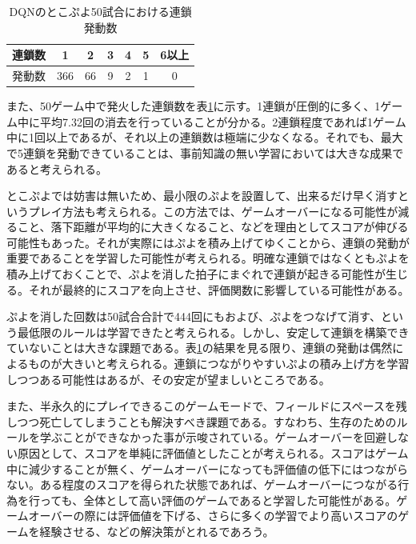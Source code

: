\documentclass[12pt]{jarticle}
\begin{document}
\begin{table}[htb]
\begin{center}
\caption{DQNのとこぷよ50試合における連鎖発動数} \label{tab:dqn_chain_tokopuyo}
\begin{tabular}{|l|c|c|c|c|c|c|} \hline
連鎖数 & 1 & 2 & 3 & 4 & 5 & 6以上\\ \hline
発動数 & 366 & 66 & 9 & 2 & 1 & 0\\ \hline
\end{tabular}
\end{center}
\end{table}

また、50ゲーム中で発火した連鎖数を表\ref{tab:dqn_chain_tokopuyo}に示す。1連鎖が圧倒的に多く、1ゲーム中に平均7.32回の消去を行っていることが分かる。2連鎖程度であれば1ゲーム中に1回以上であるが、それ以上の連鎖数は極端に少なくなる。それでも、最大で5連鎖を発動できていることは、事前知識の無い学習においては大きな成果であると考えられる。

とこぷよでは妨害は無いため、最小限のぷよを設置して、出来るだけ早く消すというプレイ方法も考えられる。この方法では、ゲームオーバーになる可能性が減ること、落下距離が平均的に大きくなること、などを理由としてスコアが伸びる可能性もあった。それが実際にはぷよを積み上げてゆくことから、連鎖の発動が重要であることを学習した可能性が考えられる。明確な連鎖ではなくともぷよを積み上げておくことで、ぷよを消した拍子にまぐれで連鎖が起きる可能性が生じる。それが最終的にスコアを向上させ、評価関数に影響している可能性がある。

ぷよを消した回数は50試合合計で444回にもおよび、ぷよをつなげて消す、という最低限のルールは学習できたと考えられる。しかし、安定して連鎖を構築できていないことは大きな課題である。表\ref{tab:dqn_chain_tokopuyo}の結果を見る限り、連鎖の発動は偶然によるものが大きいと考えられる。連鎖につながりやすいぷよの積み上げ方を学習しつつある可能性はあるが、その安定が望ましいところである。

また、半永久的にプレイできるこのゲームモードで、フィールドにスペースを残しつつ死亡してしまうことも解決すべき課題である。すなわち、生存のためのルールを学ぶことができなかった事が示唆されている。ゲームオーバーを回避しない原因として、スコアを単純に評価値としたことが考えられる。スコアはゲーム中に減少することが無く、ゲームオーバーになっても評価値の低下にはつながらない。ある程度のスコアを得られた状態であれば、ゲームオーバーにつながる行為を行っても、全体として高い評価のゲームであると学習した可能性がある。ゲームオーバーの際には評価値を下げる、さらに多くの学習でより高いスコアのゲームを経験させる、などの解決策がとれるであろう。
\end{document}
